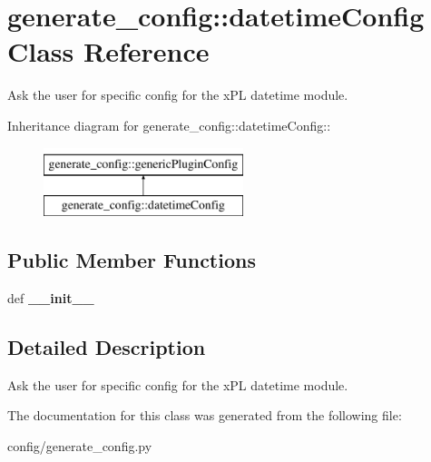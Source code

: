 \hypertarget{classgenerate__config_1_1datetimeConfig}{
\section{generate\_\-config::datetimeConfig Class Reference}
\label{classgenerate__config_1_1datetimeConfig}
}
Ask the user for specific config for the xPL datetime module.  


Inheritance diagram for generate\_\-config::datetimeConfig::\begin{figure}[H]
\begin{center}
\leavevmode
\includegraphics[height=2cm]{classgenerate__config_1_1datetimeConfig}
\end{center}
\end{figure}
\subsection*{Public Member Functions}
\begin{CompactItemize}
\item 
\hypertarget{classgenerate__config_1_1datetimeConfig_84bd0d1f10cb05b3513a3da208cab7bb}{
def \textbf{\_\-\_\-init\_\-\_\-}}
\label{classgenerate__config_1_1datetimeConfig_84bd0d1f10cb05b3513a3da208cab7bb}

\end{CompactItemize}


\subsection{Detailed Description}
Ask the user for specific config for the xPL datetime module. 

The documentation for this class was generated from the following file:\begin{CompactItemize}
\item 
config/generate\_\-config.py\end{CompactItemize}
